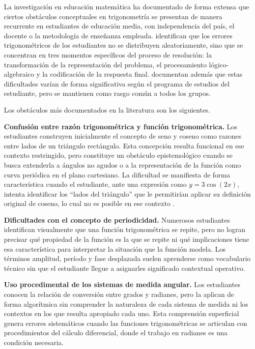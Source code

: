 La investigación en educación matemática ha documentado de forma extensa que ciertos obstáculos conceptuales en trigonometría se presentan de manera recurrente en estudiantes de educación media, con independencia del país, el docente o la metodología de enseñanza empleada. \textcite{arhinAnalysisHighSchool2021} identifican que los errores trigonométricos de los estudiantes no se distribuyen aleatoriamente, sino que se concentran en tres momentos específicos del proceso de resolución: la transformación de la representación del problema, el procesamiento lógico-algebraico y la codificación de la respuesta final. \textcite{owusuStudentsAcademicStruggles2025} documentan además que estas dificultades varían de forma significativa según el programa de estudios del estudiante, pero se mantienen como rasgo común a todos los grupos.

Los obstáculos más documentados en la literatura son los siguientes.

\textbf{Confusión entre razón trigonométrica y función trigonométrica.} Los estudiantes construyen inicialmente el concepto de seno y coseno como razones entre lados de un triángulo rectángulo. Esta concepción resulta funcional en ese contexto restringido, pero constituye un obstáculo epistemológico \parencite{brousseauTheoryDidacticalSituations2002} cuando se busca extenderla a ángulos no agudos o a la representación de la función como curva periódica en el plano cartesiano. La dificultad se manifiesta de forma característica cuando el estudiante, ante una expresión como $y = 3\cos(2x)$, intenta identificar los ``lados del triángulo'' que le permitirían aplicar su definición original de coseno, lo cual no es posible en ese contexto \parencite{montiel-espinosaDesarrolloPensamientoTrigonometrico2013}.

\textbf{Dificultades con el concepto de periodicidad.} Numerosos estudiantes identifican visualmente que una función trigonométrica se repite, pero no logran precisar qué propiedad de la función es la que se repite ni qué implicaciones tiene esa característica para interpretar la situación que la función modela. Los términos amplitud, período y fase desplazada suelen aprenderse como vocabulario técnico sin que el estudiante llegue a asignarles significado contextual operativo.

\textbf{Uso procedimental de los sistemas de medida angular.} Los estudiantes conocen la relación de conversión entre grados y radianes, pero la aplican de forma algorítmica sin comprender la naturaleza de cada sistema de medida ni los contextos en los que resulta apropiado cada uno. Esta comprensión superficial genera errores sistemáticos cuando las funciones trigonométricas se articulan con procedimientos del cálculo diferencial, donde el trabajo en radianes es una condición necesaria.

